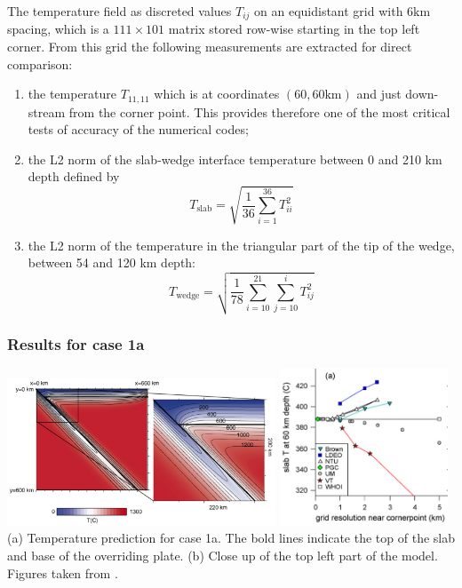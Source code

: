 The temperature field as discreted values $T_{ij}$ on
an equidistant grid with $6\text{km}$ spacing, which is a $111\times101$ 
matrix stored row-wise starting in the top left corner. 
From this grid the following measurements are extracted for direct comparison:

\begin{enumerate}
\item the temperature $T_{11,11}$ which is at coordinates $(60, 60\text{km})$ 
and just down-stream from the corner point. This provides therefore
one of the most critical tests of accuracy of the numerical codes;

\item the L2 norm of the slab-wedge interface temperature between
0 and 210 km depth defined by
\[
T_{\text{slab}} = \sqrt{\frac{1}{36}\sum_{i=1}^{36} T_{ii}^2}
\]

\item the L2 norm of the temperature in the triangular part of the
tip of the wedge, between 54 and 120 km depth:
\[
T_{\text{wedge}} = \sqrt{ \frac{1}{78} \sum_{i=10}^{21} \sum_{j=10}^i T_{ij}^2}
\]

\end{enumerate}

\newpage
\subsubsection*{Results for case 1a}

\begin{center}
\includegraphics[width=8cm]{python_codes/fieldstone_45/images/vack08_0}
\includegraphics[width=5cm]{python_codes/fieldstone_45/images/vack08_1}\\
{\small (a) Temperature prediction for case 1a. The bold lines indicate the top of the slab and base of the overriding plate. (b) Close up of the top left part of
the model. Figures taken from \cite{vack08}.}
\end{center}


